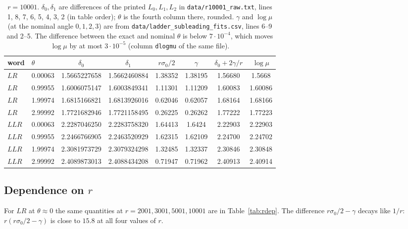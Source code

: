 \documentclass[11pt]{amsart}
\theoremstyle{definition}
\theoremstyle{remark}
\begin{document}
\begin{table}[ht]
\centering
\begin{tabular}{llcccccc}
\toprule
word & $\theta$ & $\delta_0$ & $\delta_1$ & $r\sigma_0/2$ & $\gamma$ & $\delta_0 + 2\gamma/r$ & $\log\mu$ \\
\midrule
$LR$  & 0.00063 & 1.5665227658 & 1.5662460884 & 1.38352 & 1.38195 & 1.56680 & 1.5668 \\
$LR$  & 0.99955 & 1.6006075147 & 1.6003849341 & 1.11301 & 1.11209 & 1.60083 & 1.60086 \\
$LR$  & 1.99974 & 1.6815166821 & 1.6813926016 & 0.62046 & 0.62057 & 1.68164 & 1.68166 \\
$LR$  & 2.99992 & 1.7721682946 & 1.7721158495 & 0.26225 & 0.26262 & 1.77222 & 1.77223 \\
$LLR$ & 0.00063 & 2.2287046250 & 2.2283758320 & 1.64413 & 1.6424  & 2.22903 & 2.22903 \\
$LLR$ & 0.99955 & 2.2466766905 & 2.2463520929 & 1.62315 & 1.62109 & 2.24700 & 2.24702 \\
$LLR$ & 1.99974 & 2.3081973729 & 2.3079324298 & 1.32485 & 1.32337 & 2.30846 & 2.30848 \\
$LLR$ & 2.99992 & 2.4089873013 & 2.4088434208 & 0.71947 & 0.71962 & 2.40913 & 2.40914 \\
\bottomrule
\end{tabular}
\caption{$r = 10001$. $\delta_0, \delta_1$ are differences of the printed $L_0, L_1, L_2$ in
\texttt{data/r10001\_raw.txt}, lines 1, 8, 7, 6, 5, 4, 3, 2 (in table order);
$\theta$ is the fourth column there, rounded. $\gamma$ and $\log\mu$ (at the nominal
angle $0,1,2,3$) are from \texttt{data/ladder\_subleading\_fits.csv}, lines 6--9 and
2--5. The difference between the exact and nominal $\theta$ is below $7\cdot10^{-4}$,
which moves $\log\mu$ by at most $3\cdot10^{-5}$ (column \texttt{dlogmu} of the same
file).}
\label{tab:r10001}
\end{table}

\subsection{Dependence on $r$}
For $LR$ at $\theta \approx 0$ the same quantities at $r = 2001, 3001, 5001, 10001$
are in Table~\ref{tab:rdep}. The difference $r\sigma_0/2 - \gamma$ decays like $1/r$:
$r(r\sigma_0/2 - \gamma)$ is close to $15.8$ at all four values of $r$.
\end{document}
